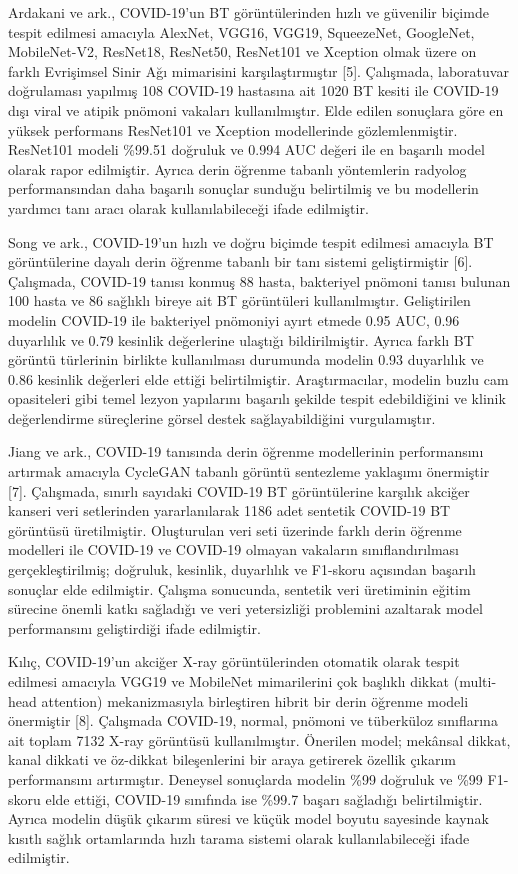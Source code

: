 \documentclass[conference]{IEEEtran}
\begin{document}
Ardakani ve ark., COVID-19'un BT görüntülerinden hızlı ve güvenilir biçimde tespit edilmesi amacıyla AlexNet, VGG16, VGG19, SqueezeNet, GoogleNet, MobileNet-V2, ResNet18, ResNet50, ResNet101 ve Xception olmak üzere on farklı Evrişimsel Sinir Ağı mimarisini karşılaştırmıştır [5]. Çalışmada, laboratuvar doğrulaması yapılmış 108 COVID-19 hastasına ait 1020 BT kesiti ile COVID-19 dışı viral ve atipik pnömoni vakaları kullanılmıştır. Elde edilen sonuçlara göre en yüksek performans ResNet101 ve Xception modellerinde gözlemlenmiştir. ResNet101 modeli \%99.51 doğruluk ve 0.994 AUC değeri ile en başarılı model olarak rapor edilmiştir. Ayrıca derin öğrenme tabanlı yöntemlerin radyolog performansından daha başarılı sonuçlar sunduğu belirtilmiş ve bu modellerin yardımcı tanı aracı olarak kullanılabileceği ifade edilmiştir.

Song ve ark., COVID-19'un hızlı ve doğru biçimde tespit edilmesi amacıyla BT görüntülerine dayalı derin öğrenme tabanlı bir tanı sistemi geliştirmiştir [6]. Çalışmada, COVID-19 tanısı konmuş 88 hasta, bakteriyel pnömoni tanısı bulunan 100 hasta ve 86 sağlıklı bireye ait BT görüntüleri kullanılmıştır. Geliştirilen modelin COVID-19 ile bakteriyel pnömoniyi ayırt etmede 0.95 AUC, 0.96 duyarlılık ve 0.79 kesinlik değerlerine ulaştığı bildirilmiştir. Ayrıca farklı BT görüntü türlerinin birlikte kullanılması durumunda modelin 0.93 duyarlılık ve 0.86 kesinlik değerleri elde ettiği belirtilmiştir. Araştırmacılar, modelin buzlu cam opasiteleri gibi temel lezyon yapılarını başarılı şekilde tespit edebildiğini ve klinik değerlendirme süreçlerine görsel destek sağlayabildiğini vurgulamıştır.

Jiang ve ark., COVID-19 tanısında derin öğrenme modellerinin performansını artırmak amacıyla CycleGAN tabanlı görüntü sentezleme yaklaşımı önermiştir [7]. Çalışmada, sınırlı sayıdaki COVID-19 BT görüntülerine karşılık akciğer kanseri veri setlerinden yararlanılarak 1186 adet sentetik COVID-19 BT görüntüsü üretilmiştir. Oluşturulan veri seti üzerinde farklı derin öğrenme modelleri ile COVID-19 ve COVID-19 olmayan vakaların sınıflandırılması gerçekleştirilmiş; doğruluk, kesinlik, duyarlılık ve F1-skoru açısından başarılı sonuçlar elde edilmiştir. Çalışma sonucunda, sentetik veri üretiminin eğitim sürecine önemli katkı sağladığı ve veri yetersizliği problemini azaltarak model performansını geliştirdiği ifade edilmiştir.

Kılıç, COVID-19'un akciğer X-ray görüntülerinden otomatik olarak tespit edilmesi amacıyla VGG19 ve MobileNet mimarilerini çok başlıklı dikkat (multi-head attention) mekanizmasıyla birleştiren hibrit bir derin öğrenme modeli önermiştir [8]. Çalışmada COVID-19, normal, pnömoni ve tüberküloz sınıflarına ait toplam 7132 X-ray görüntüsü kullanılmıştır. Önerilen model; mekânsal dikkat, kanal dikkati ve öz-dikkat bileşenlerini bir araya getirerek özellik çıkarım performansını artırmıştır. Deneysel sonuçlarda modelin \%99 doğruluk ve \%99 F1-skoru elde ettiği, COVID-19 sınıfında ise \%99.7 başarı sağladığı belirtilmiştir. Ayrıca modelin düşük çıkarım süresi ve küçük model boyutu sayesinde kaynak kısıtlı sağlık ortamlarında hızlı tarama sistemi olarak kullanılabileceği ifade edilmiştir.
\end{document}

